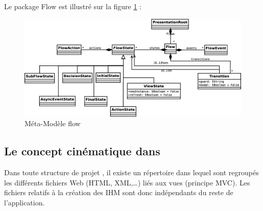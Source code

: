 \begin{itemize}
Le package Flow est illustré sur la figure \ref{fig:flow} :

\begin{figure}[h]
  \centering
  \includegraphics[scale=.3]{img/flow.eps}
  \caption{Méta-Modèle flow}
  \label{fig:flow}
\end{figure}

\end{itemize}


\subsection{Le concept cinématique dans \kwplay{}}
Dans toute structure de projet \kwplay{}, il existe un répertoire dans lequel sont regroupés les différents fichiers Web (HTML, XML,\dots) liés aux vues (principe MVC). Les fichiers relatifs à la création des \textsc{IHM} sont donc indépendants du reste de l'application.   

